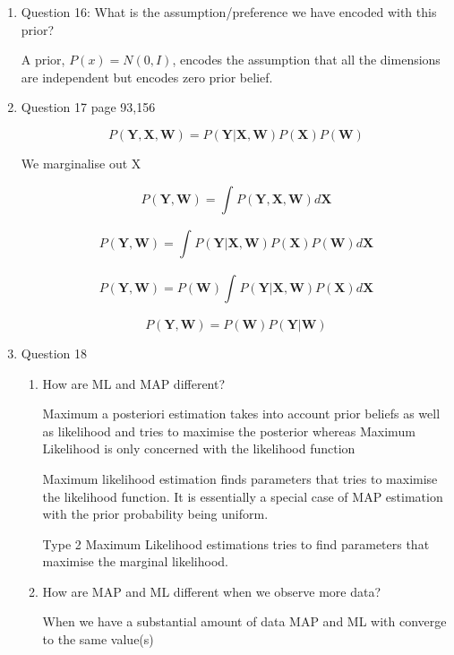 \documentclass[13pt]{article}
\begin{document}
\begin{enumerate}
  \item{\large Question 16: What is the assumption/preference we have encoded with this prior?}
  
  A prior, $P(x) = N(0,I)$, encodes the assumption that all the dimensions are independent but encodes zero prior belief.

  \item{\large Question 17}
  page 93,156
  
  
  
  $$P(\mathbf{Y}, \mathbf{X}, \mathbf{W}) = P(\mathbf{Y}|\mathbf{X}, \mathbf{W})P(\mathbf{X})P(\mathbf{W})$$
  
  
  We marginalise out X
  
  $$P(\mathbf{Y},\mathbf{W}) = \int_{}^{} P(\mathbf{Y}, \mathbf{X}, \mathbf{W})  d\mathbf{X}$$
  
  
  $$P(\mathbf{Y},\mathbf{W})=  \int_{}^{} P(\mathbf{Y}|\mathbf{X}, \mathbf{W})P(\mathbf{X})P(\mathbf{W}) d\mathbf{X}$$
  
  $$P(\mathbf{Y},\mathbf{W})= P(\mathbf{W}) \int_{}^{} P(\mathbf{Y}|\mathbf{X}, \mathbf{W})P(\mathbf{X}) d\mathbf{X}$$
  
  $$P(\mathbf{Y},\mathbf{W})= P(\mathbf{W}) P(\mathbf{Y}|\mathbf{W})$$

  
  \item{\large Question 18}
  
  \begin{enumerate}
  
  
      \item{\Large  How are ML and MAP different?}
      
      Maximum a posteriori estimation takes into account prior beliefs as well as likelihood and tries to maximise the posterior whereas Maximum Likelihood is only concerned with the likelihood function
      
      Maximum likelihood estimation finds parameters that tries to maximise the likelihood function. It is essentially a special case of MAP estimation with the prior probability being uniform.
      
      Type 2 Maximum Likelihood estimations tries to find parameters that maximise the marginal likelihood.
      
      
      \item{\Large How are MAP and ML different when we observe more data?}
      
      
      
      When we have a substantial amount of data MAP and ML with converge to the same value(s)
      

\end{enumerate}
\end{enumerate}
\end{document}
